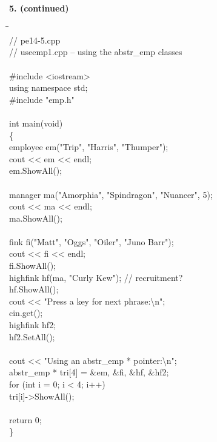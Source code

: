\documentclass[10 pt]{amsart}
\newlength{\cwidth}
\newenvironment{cpartContinued}[2][\cwidth]
	{%
		\\ %
		\textbf{#2. (continued)}%
		\\
		\phantom{#2. }
		\begin{minipage}[t]{#1}%
		\setlength{\parindent}{0pt}%
		\setlength{\parskip}{2ex}%
	}
	{%
		\end{minipage}%
	}
\newcommand{\tbs}{\textbackslash}
\begin{document}
	\begin{cpartContinued}{5}
		{\ttfamily
			\begin{tabbing}
				\phantom{\qquad}\=\phantom{\qquad}\=\phantom{\qquad}\= \\
				// pe14-5.cpp \\
				// useemp1.cpp -- using the abstr\_emp classes \\
				\\
				\#include <iostream> \\
				using namespace std; \\
				\#include "emp.h" \\
				\\
				int main(void) \\
				\{
				\+ \\
					employee em("Trip", "Harris", "Thumper"); \\
					cout << em << endl; \\
					em.ShowAll(); \\
					\\
					manager ma("Amorphia", "Spindragon", "Nuancer", 5); \\
					cout << ma << endl; \\
					ma.ShowAll(); \\
					\\
					fink fi("Matt", "Oggs", "Oiler", "Juno Barr"); \\
					cout << fi << endl; \\
					fi.ShowAll(); \\
					highfink hf(ma, "Curly Kew"); // recruitment? \\
					hf.ShowAll(); \\
					cout << "Press a key for next phrase:\tbs n"; \\
					cin.get(); \\
					highfink hf2; \\
					hf2.SetAll(); \\
					\\
					cout << "Using an abstr\_emp * pointer:\tbs n"; \\
					abstr\_emp * tri[4] = {\&em, \&fi, \&hf, \&hf2}; \\
					for (int i = 0; i < 4; i++) \\
					\> tri[i]->ShowAll(); \\
					\\
					return 0; \\
				\< \}
			\end{tabbing}
		}		


\end{cpartContinued}
\end{document}
